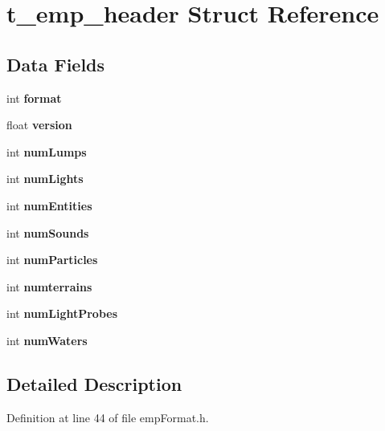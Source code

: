 \hypertarget{structt__emp__header}{}\section{t\+\_\+emp\+\_\+header Struct Reference}
\label{structt__emp__header}
\subsection*{Data Fields}
\begin{DoxyCompactItemize}
\item 
int {\bfseries format}\hypertarget{structt__emp__header_a27dbb4378547e85d610cf0fac626d705}{}\label{structt__emp__header_a27dbb4378547e85d610cf0fac626d705}

\item 
float {\bfseries version}\hypertarget{structt__emp__header_a717ad95e55cd18d4175d326532801b31}{}\label{structt__emp__header_a717ad95e55cd18d4175d326532801b31}

\item 
int {\bfseries num\+Lumps}\hypertarget{structt__emp__header_a58abadabd9ac5bd1da177181ac449592}{}\label{structt__emp__header_a58abadabd9ac5bd1da177181ac449592}

\item 
int {\bfseries num\+Lights}\hypertarget{structt__emp__header_a46637017cff117d644d26950effea781}{}\label{structt__emp__header_a46637017cff117d644d26950effea781}

\item 
int {\bfseries num\+Entities}\hypertarget{structt__emp__header_a20df0c4e8567fd34c76944131415bb38}{}\label{structt__emp__header_a20df0c4e8567fd34c76944131415bb38}

\item 
int {\bfseries num\+Sounds}\hypertarget{structt__emp__header_a0b582d64356dca639e40c66e7f6ad379}{}\label{structt__emp__header_a0b582d64356dca639e40c66e7f6ad379}

\item 
int {\bfseries num\+Particles}\hypertarget{structt__emp__header_a43dbd820ea68f7174f31af0fd78285e2}{}\label{structt__emp__header_a43dbd820ea68f7174f31af0fd78285e2}

\item 
int {\bfseries numterrains}\hypertarget{structt__emp__header_aa6cb07982714de9ee96fc1fb611705e1}{}\label{structt__emp__header_aa6cb07982714de9ee96fc1fb611705e1}

\item 
int {\bfseries num\+Light\+Probes}\hypertarget{structt__emp__header_a087206d8164d1e1ec848d70b8a02ebe6}{}\label{structt__emp__header_a087206d8164d1e1ec848d70b8a02ebe6}

\item 
int {\bfseries num\+Waters}\hypertarget{structt__emp__header_a7c8b8db34e5ad8b5987cc440106f7313}{}\label{structt__emp__header_a7c8b8db34e5ad8b5987cc440106f7313}

\end{DoxyCompactItemize}


\subsection{Detailed Description}


Definition at line 44 of file emp\+Format.\+h.

